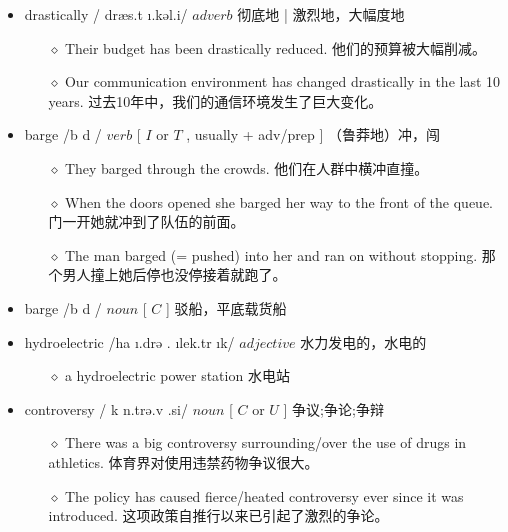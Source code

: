 \documentclass[a4paper,top=2.5cm,buttom=2.5cm10.5pt]{book}
\begin{document}
\begin{itemize}
\item drastically / \textprimstress dræs.t \i .kəl.i/ $ adverb $  彻底地 | 激烈地，大幅度地
\begin{itemize}
\item[$\diamond$] Their budget has been drastically reduced.
他们的预算被大幅削减。
\item[$\diamond$] Our communication environment has changed drastically in the last 10 years.
过去10年中，我们的通信环境发生了巨大变化。
\end{itemize}
\end{itemize}
\begin{itemize}
\item barge /b \textscripta  \textlengthmark d \textyogh / $ verb $ [  $ I $  or  $ T $ ,  usually + adv/prep ] （鲁莽地）冲，闯
\begin{itemize}
\item[$\diamond$] They barged through the crowds.
他们在人群中横冲直撞。
\item[$\diamond$] When the doors opened she barged her way to the front of the queue.
门一开她就冲到了队伍的前面。
\item[$\diamond$] The man barged (= pushed) into her and ran on without stopping.
那个男人撞上她后停也没停接着就跑了。
\end{itemize}
\end{itemize}
\begin{itemize}
\item barge /b \textscripta  \textlengthmark d \textyogh / $ noun $ [  $ C $  ] 驳船，平底载货船
\end{itemize}
\begin{itemize}
\item hydroelectric /\textsecstress ha \i .drə \textupsilon . \i  \textprimstress lek.tr \i k/ $ adjective $  水力发电的，水电的
\begin{itemize}
\item[$\diamond$] a hydroelectric power station
水电站
\end{itemize}
\end{itemize}
\begin{itemize}
\item controversy / \textprimstress k \textturnscripta n.trə.v \textrevepsilon  \textlengthmark .si/ $ noun $ [  $ C $  or  $ U $  ] 争议;争论;争辩
\begin{itemize}
\item[$\diamond$] There was a big controversy surrounding/over the use of drugs in athletics.
体育界对使用违禁药物争议很大。
\item[$\diamond$] The policy has caused fierce/heated controversy ever since it was introduced.
这项政策自推行以来已引起了激烈的争论。
\end{itemize}
\end{itemize}
\end{document}
